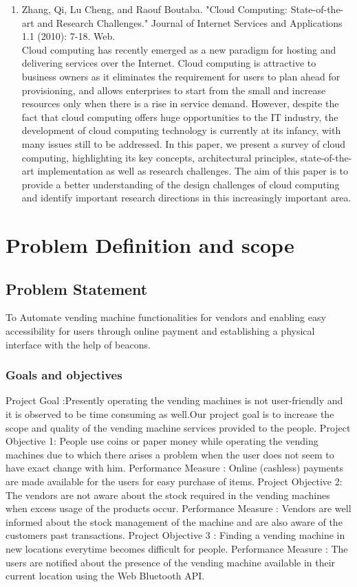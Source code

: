 \documentclass[oneside,a4paper,12pt]{report}
\begin{document}
\begin{enumerate}
\item Zhang, Qi, Lu Cheng, and Raouf Boutaba. "Cloud Computing: State-of-the-art and Research Challenges." Journal of Internet Services and Applications 1.1 (2010): 7-18. Web.\\
Cloud computing has recently emerged as a new paradigm for hosting and delivering services over the Internet. Cloud computing is attractive to business owners as it eliminates the requirement for users to plan ahead for provisioning, and allows enterprises to start from the small and increase resources only when there is a rise in service demand. However, despite the fact that cloud computing offers huge opportunities to the IT industry, the development of cloud computing technology is currently at its infancy, with many issues still to be addressed. In this paper, we present a survey of cloud computing, highlighting its key concepts, architectural principles, state-of-the-art implementation as well as research challenges. The aim of this paper is to provide a better understanding of the design challenges of cloud computing and identify important research directions in this increasingly important area.\\
\end{enumerate}   



\chapter{Problem Definition and scope}
\section{Problem Statement}
 To Automate vending machine functionalities for vendors and enabling easy accessibility for users through online payment and establishing a physical interface with the help of beacons. 


\subsection{Goals and objectives}  
Project Goal :Presently operating the vending machines is not user-friendly and it is observed to be time consuming as well.Our project goal is to increase the scope and quality of the vending machine services provided to the people. 
Project Objective 1:
People use coins or paper money while operating the vending machines due to which there arises a problem when the user does not seem to have exact change with him.
Performance Measure :
Online (cashless) payments are made available for the users for easy purchase of items.
Project Objective 2:
The vendors are not aware about the stock required in the vending machines when excess usage of the products occur.
Performance Measure :
Vendors are well informed about the stock management of the machine and are also aware of the customers past transactions.
Project Objective 3 :
Finding a vending machine in new locations everytime becomes difficult for people.
Performance Measure :
The users are notified about the presence of the vending machine available in their current location using the Web Bluetooth API.
	
\end{document}
